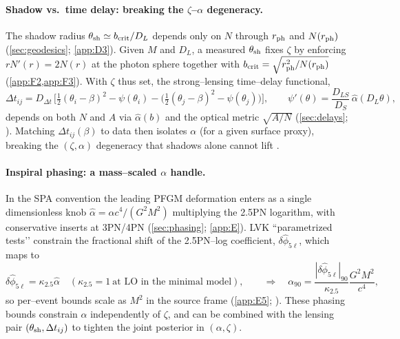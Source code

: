 \documentclass{iopjournal}
\begin{document}
\paragraph{Shadow vs.\ time delay: breaking the $\zeta$–$\alpha$ degeneracy.}
The shadow radius $\theta_{\rm sh}\simeq b_{\rm crit}/D_L$ depends only on $N$ through $r_{\rm ph}$ and $N(r_{\rm ph})$ (\cref{sec:geodesics}; \cref{app:D3}). Given $M$ and $D_L$, a measured $\theta_{\rm sh}$ fixes $\zeta$ by enforcing $rN'(r)=2N(r)$ at the photon sphere together with $b_{\rm crit}=\sqrt{r_{\rm ph}^2/N(r_{\rm ph})}$ (\cref{app:F2,app:F3}). With $\zeta$ thus set, the strong–lensing time–delay functional,
\[
\Delta t_{ij}=D_{\Delta t}\,\Big[\tfrac12(\theta_i-\beta)^2-\psi(\theta_i)-\big(\tfrac12(\theta_j-\beta)^2-\psi(\theta_j)\big)\Big],\qquad
\psi'(\theta)=\frac{D_{LS}}{D_S}\,\hat\alpha(D_L\theta),
\]
depends on both $N$ and $A$ via $\hat\alpha(b)$ and the optical metric $\sqrt{A/N}$ (\cref{sec:delays}; ). Matching $\Delta t_{ij}(\beta)$ to data then isolates $\alpha$ (for a given surface proxy), breaking the $(\zeta,\alpha)$ degeneracy that shadows alone cannot lift \cite{SchneiderEhlersFalco1992,Perlick2004LRR}.

\paragraph{Inspiral phasing: a mass–scaled $\alpha$ handle.}
In the SPA convention the leading PFGM deformation enters as a single dimensionless knob $\widehat\alpha=\alpha c^{4}/(G^{2}M^{2})$ multiplying the 2.5PN logarithm, with conservative inserts at 3PN/4PN (\cref{sec:phasing}; \cref{app:E}). LVK ``parametrized tests’’ constrain the fractional shift of the 2.5PN–log coefficient, $\delta\hat\phi_{5\ell}$, which maps to
\[
\delta\hat\phi_{5\ell}=\kappa_{2.5}\widehat\alpha\quad(\kappa_{2.5}=1\ \text{at LO in the minimal model}),
\qquad
\Rightarrow\quad
\alpha_{90}=\frac{|\delta\hat\phi_{5\ell}|_{90}}{\kappa_{2.5}}\frac{G^{2}M^{2}}{c^{4}},
\]
so per–event bounds scale as $M^{2}$ in the source frame (\cref{app:E5}; \cite{CutlerFlanagan1994,SathyaprakashSchutz2009,Blanchet2014LRR}). These phasing bounds constrain $\alpha$ independently of $\zeta$, and can be combined with the lensing pair $(\theta_{\rm sh},\Delta t_{ij})$ to tighten the joint posterior in $(\alpha,\zeta)$.
\end{document}
